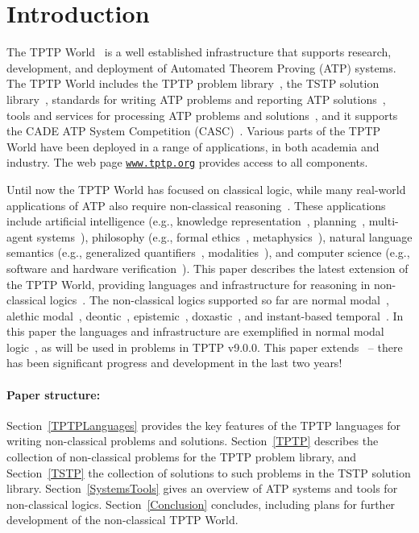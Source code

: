 \documentclass{ceurart}
\begin{document}
\section{Introduction}
\label{Introduction}

The TPTP World~\cite{Sut17} is a well established infrastructure that supports research, 
development, and deployment of Automated Theorem Proving (ATP) systems.
The TPTP World includes the TPTP problem library~\cite{Sut09}, 
the TSTP solution library~\cite{Sut10}, 
standards for writing ATP problems and reporting ATP solutions~\cite{SS+06,Sut08-KEAPPA}, 
tools and services for processing ATP problems and solutions~\cite{Sut10}, 
and it supports the CADE ATP System Competition (CASC)~\cite{Sut16}.
Various parts of the TPTP World have been deployed in a range of applications,
in both academia and industry.
The web page \href{https://www.tptp.org}{\tt www.tptp.org} provides access to all 
components.

Until now the TPTP World has focused on classical logic, while many real-world applications of 
ATP also require non-classical reasoning~\cite{SB24}.
These applications include artificial intelligence (e.g., knowledge representation~\cite{GG+11}, 
planning~\cite{LAR20}, multi-agent systems~\cite{CLS23}), philosophy (e.g., 
formal ethics~\cite{BPT20}, metaphysics~\cite{BW16}), natural language semantics (e.g., 
generalized quantifiers~\cite{vBe87}, modalities~\cite{Kra77}), and computer science (e.g., 
software and hardware verification~\cite{Bry91}).
This paper describes the latest extension of the TPTP World, providing languages and
infrastructure for reasoning in non-classical logics~\cite{Pri08,Gob01}.
The non-classical logics supported so far are
normal modal~\cite{FM98},
alethic modal~\cite{Sch06-CPL},
deontic~\cite{Hil71},
epistemic~\cite{vDH15},
doxastic~\cite{Hin62}, and
instant-based temporal~\cite{GR22}.
In this paper the languages and infrastructure are exemplified in normal modal logic~\cite{BBW06},
as will be used in problems in TPTP v9.0.0.
This paper extends~\cite{SF+22} -- there has been significant progress and development in the 
last two years!

\paragraph{Paper structure:}
Section~\ref{TPTPLanguages} provides the key features of the TPTP languages for writing
non-classical problems and solutions. 
Section~\ref{TPTP} describes the collection of non-classical problems for the TPTP problem library, 
and Section~\ref{TSTP} the collection of solutions to such problems in the TSTP solution library.
Section~\ref{SystemsTools} gives an overview of ATP systems and tools for non-classical logics.
Section~\ref{Conclusion} concludes, including plans for further development of the non-classical
TPTP World.
\end{document}

